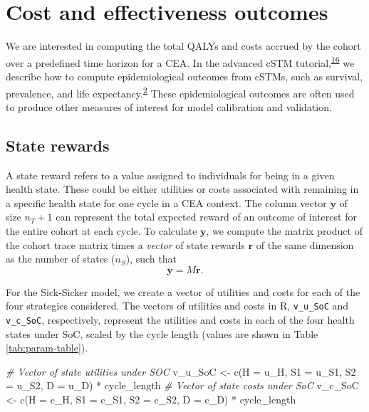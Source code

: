 \documentclass[
]{article}
\newenvironment{Shaded}{\begin{snugshade}}{\end{snugshade}}
\newcommand{\AttributeTok}[1]{\textcolor[rgb]{0.77,0.63,0.00}{#1}}
\newcommand{\CommentTok}[1]{\textcolor[rgb]{0.56,0.35,0.01}{\textit{#1}}}
\newcommand{\FunctionTok}[1]{\textcolor[rgb]{0.00,0.00,0.00}{#1}}
\newcommand{\NormalTok}[1]{#1}
\newcommand{\OtherTok}[1]{\textcolor[rgb]{0.56,0.35,0.01}{#1}}
\newcommand{\SpecialCharTok}[1]{\textcolor[rgb]{0.00,0.00,0.00}{#1}}
\begin{document}
\hypertarget{cost-and-effectiveness-outcomes}{%
\section{Cost and effectiveness outcomes}\label{cost-and-effectiveness-outcomes}}

We are interested in computing the total QALYs and costs accrued by the cohort over a predefined time horizon for a CEA. In the advanced cSTM tutorial,\textsuperscript{\protect\hyperlink{ref-Alarid-Escudero2021b}{16}} we describe how to compute epidemiological outcomes from cSTMs, such as survival, prevalence, and life expectancy.\textsuperscript{\protect\hyperlink{ref-Siebert2012c}{2}} These epidemiological outcomes are often used to produce other measures of interest for model calibration and validation.

\hypertarget{state-rewards}{%
\subsection{State rewards}\label{state-rewards}}

A state reward refers to a value assigned to individuals for being in a given health state. These could be either utilities or costs associated with remaining in a specific health state for one cycle in a CEA context. The column vector \(\mathbf{y}\) of size \(n_T+1\) can represent the total expected reward of an outcome of interest for the entire cohort at each cycle. To calculate \(\mathbf{y}\), we compute the matrix product of the cohort trace matrix times a \emph{vector} of state rewards \(\mathbf{r}\) of the same dimension as the number of states (\(n_S\)), such that
\begin{equation}
  \mathbf{y} = M\mathbf{r}.
  \label{eq:exp-rew-cycle}
\end{equation}

For the Sick-Sicker model, we create a vector of utilities and costs for each of the four strategies considered. The vectors of utilities and costs in R, \texttt{v\_u\_SoC} and \texttt{v\_c\_SoC}, respectively, represent the utilities and costs in each of the four health states under SoC, scaled by the cycle length (values are shown in Table \ref{tab:param-table}).

\begin{Shaded}
\begin{Highlighting}[]
\CommentTok{\# Vector of state utilities under SOC}
\NormalTok{v\_u\_SoC }\OtherTok{\textless{}{-}} \FunctionTok{c}\NormalTok{(}\AttributeTok{H =}\NormalTok{ u\_H, }\AttributeTok{S1 =}\NormalTok{ u\_S1, }\AttributeTok{S2 =}\NormalTok{ u\_S2, }\AttributeTok{D =}\NormalTok{ u\_D) }\SpecialCharTok{*}\NormalTok{ cycle\_length }
\CommentTok{\# Vector of state costs under SoC}
\NormalTok{v\_c\_SoC }\OtherTok{\textless{}{-}} \FunctionTok{c}\NormalTok{(}\AttributeTok{H =}\NormalTok{ c\_H, }\AttributeTok{S1 =}\NormalTok{ c\_S1, }\AttributeTok{S2 =}\NormalTok{ c\_S2, }\AttributeTok{D =}\NormalTok{ c\_D) }\SpecialCharTok{*}\NormalTok{ cycle\_length }
\end{Highlighting}
\end{Shaded}
\end{document}

